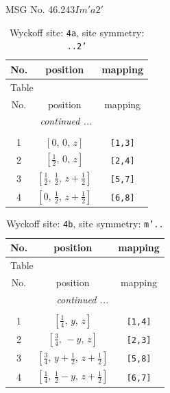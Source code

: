 \documentclass[fleqn,8pt]{jsarticle}
\begin{document}
\setcounter{MaxMatrixCols}{32}

\renewcommand{\tablename}{Table~}
\renewcommand{\figurename}{Figure~}
\begin{center}
\LARGE
MSG No. 46.243\quad$Im'a2'$
\end{center}
\renewcommand{\arraystretch}{1.2}
\begin{longtable}{ccc}
\caption{Wyckoff site: {\tt 4a}, site symmetry: {\tt ..2'}}
 \\
 \hline \hline
No. & position & mapping \\ \hline \endfirsthead

\multicolumn{2}{l}{\tablename\ \thetable{}} \\
 \hline \hline
No. & position & mapping \\ \hline \endhead

 \hline \hline
\multicolumn{2}{r}{\footnotesize\it continued ...} \\ \endfoot

 \hline \hline
\multicolumn{2}{r}{} \\ \endlastfoot

1 & $\left[ 0,\, 0,\, z \right]$ & {\tt [1,3]} \\ \hline
2 & $\left[ \frac{1}{2},\, 0,\, z \right]$ & {\tt [2,4]} \\ \hline
3 & $\left[ \frac{1}{2},\, \frac{1}{2},\, z + \frac{1}{2} \right]$ & {\tt [5,7]} \\ \hline
4 & $\left[ 0,\, \frac{1}{2},\, z + \frac{1}{2} \right]$ & {\tt [6,8]} \\
\end{longtable}
\renewcommand{\arraystretch}{1.2}
\begin{longtable}{ccc}
\caption{Wyckoff site: {\tt 4b}, site symmetry: {\tt m'..}}
 \\
 \hline \hline
No. & position & mapping \\ \hline \endfirsthead

\multicolumn{2}{l}{\tablename\ \thetable{}} \\
 \hline \hline
No. & position & mapping \\ \hline \endhead

 \hline \hline
\multicolumn{2}{r}{\footnotesize\it continued ...} \\ \endfoot

 \hline \hline
\multicolumn{2}{r}{} \\ \endlastfoot

1 & $\left[ \frac{1}{4},\, y,\, z \right]$ & {\tt [1,4]} \\ \hline
2 & $\left[ \frac{3}{4},\, - y,\, z \right]$ & {\tt [2,3]} \\ \hline
3 & $\left[ \frac{3}{4},\, y + \frac{1}{2},\, z + \frac{1}{2} \right]$ & {\tt [5,8]} \\ \hline
4 & $\left[ \frac{1}{4},\, \frac{1}{2} - y,\, z + \frac{1}{2} \right]$ & {\tt [6,7]} \\
\end{longtable}
\end{document}
